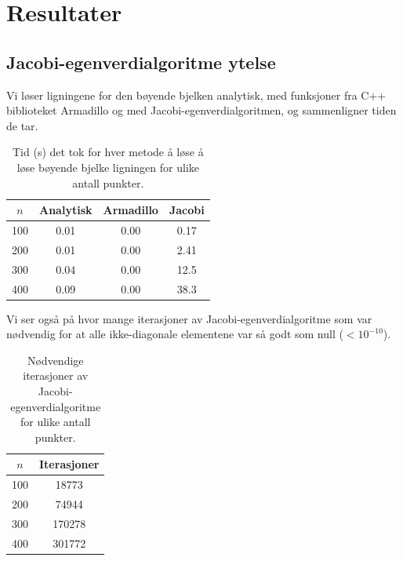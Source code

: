 \documentclass[reprint,english,notitlepage]{revtex4-1}
\begin{document}
\section{Resultater} %
	
\subsection{Jacobi-egenverdialgoritme ytelse}
	Vi løser ligningene for den bøyende bjelken analytisk, med funksjoner fra C++ biblioteket Armadillo og med Jacobi-egenverdialgoritmen, og sammenligner tiden de tar.
	
	\begin{table}[H]
		\begin{center}
			\caption{Tid (s) det tok for hver metode å løse å løse bøyende bjelke ligningen for ulike antall punkter.}
			\label{tab:time}
			\begin{tabular}{|c|c|c|c|} \hline
				\textbf{$n$} & \textbf{Analytisk} & \textbf{Armadillo} & \textbf{Jacobi} \\ \hline
				100 & 0.01 & 0.00 & 0.17 \\
				200 & 0.01 & 0.00 & 2.41 \\
				300 & 0.04 & 0.00 & 12.5 \\
				400 & 0.09 & 0.00 & 38.3 \\ \hline
			\end{tabular}
		\end{center}
	\end{table}

	Vi ser også på hvor mange iterasjoner av Jacobi-egenverdialgoritme som var nødvendig for at alle ikke-diagonale elementene var så godt som null ($< 10^{-10}$).
	\begin{table}[H]
		\begin{center}
			\caption{Nødvendige iterasjoner av Jacobi-egenverdialgoritme for ulike antall punkter.}
			\label{tab:iters}
			\begin{tabular}{|c|c|} \hline
				\textbf{$n$} & \textbf{Iterasjoner} \\ \hline
				100 & 18773 \\
				200 & 74944 \\
				300 & 170278 \\
				400 & 301772 \\ \hline
			\end{tabular}
		\end{center}
	\end{table}
\end{document}
